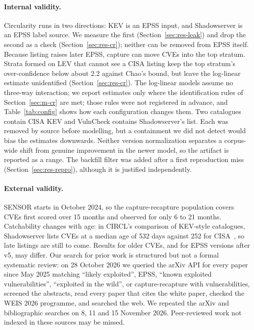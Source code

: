 \paragraph{Internal validity.} Circularity runs in two directions: KEV is an
EPSS input, and Shadowserver is an EPSS label source. We measure the first
(Section~\ref{sec:res-leak}) and drop the second as a check
(Section~\ref{sec:res-cr}); neither can be removed from EPSS itself. Because
listing raises later EPSS, capture can move CVEs into the top stratum. Strata
formed on LEV that cannot see a CISA listing keep the top stratum's
over-confidence below about 2.2 against Chao's bound, but leave the log-linear
estimate unidentified (Section~\ref{sec:res-cr}).
The log-linear models assume no three-way interaction; we report estimates only
where the identification rules of Section~\ref{sec:m-cr} are met; those rules
were not registered in advance, and Table~\ref{tab:config} shows
how each configuration changes them. Two catalogues contain CISA KEV and
VulnCheck contains Shadowserver's list. Each was removed by source before
modelling, but a containment we did not detect would bias the estimates
downwards. Neither version normalization separates a corpus-wide shift from
genuine improvement in the newer model, so the artifact is reported as a range.
The backfill filter was added after a first reproduction miss
(Section~\ref{sec:res-repro}), although it is justified independently.

\paragraph{External validity.} SENSOR starts in October 2024, so the
capture-recapture population covers CVEs first scored over 15 months and
observed for only 6 to 21 months. Catchability changes with age: in CIRCL's
comparison of KEV-style catalogues, Shadowserver lists CVEs at a median age of
532 days against 252 for CISA~\cite{circl2026kevcatalogs}, so late listings are
still to come. Results for older CVEs, and for EPSS versions after v5, may
differ. Our search for prior work is structured but not a formal systematic
review: on 28 October 2026 we queried the arXiv API for every paper since May
2025 matching ``likely exploited'', EPSS, ``known exploited vulnerabilities'',
``exploited in the wild'', or capture-recapture with vulnerabilities, screened
the abstracts, read every paper that cites the white paper, checked the WEIS
2026 programme, and searched the web. We repeated the arXiv and bibliographic
searches on 8, 11 and 15 November 2026. Peer-reviewed work not indexed in these sources may
be missed.

